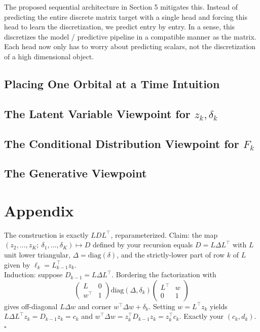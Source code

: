 \documentclass[12pt]{article}
\begin{document}
    The proposed sequential architecture in Section 5 mitigates this. Instead of predicting the entire discrete matrix target with a single head and forcing this head to learn the discretization, we predict entry by entry. In a sense, this discretizes the model / predictive pipeline in a compatible manner as the matrix. Each head now only has to worry about predicting scalars, not the discretization of a high dimensional object. 

    \subsection{Placing One Orbital at a Time Intuition}
    
    \subsection{The Latent Variable Viewpoint for $z_k, \delta_k$}

    \subsection{The Conditional Distribution Viewpoint for $F_k$}

    \subsection{The Generative Viewpoint}

    \section{Appendix}

    The construction is exactly $LDL^\top$, reparameterized. Claim: the map $(z_2,\dots,z_K;\ \delta_1,\dots,\delta_K) \mapsto D$ defined by your recursion equals $D = L\Delta L^\top$ with $L$ unit lower triangular, $\Delta = \mathrm{diag}(\delta)$, and the strictly-lower part of row $k$ of $L$ given by $\ell_k = L_{k-1}^\top z_k$. \\[-6pt]

    Induction: suppose $D_{k-1} = L\Delta L^\top$. Bordering the factorization with \[\begin{pmatrix} L & 0 \\ w^\top & 1\end{pmatrix}\mathrm{diag}(\Delta,\delta_k)\begin{pmatrix}L^\top & w \\ 0 & 1\end{pmatrix}\] gives off-diagonal $L\Delta w$ and corner $w^\top \Delta w + \delta_k$. Setting $w = L^\top z_k$ yields $L\Delta L^\top z_k = D_{k-1}z_k = c_k$ and $w^\top\Delta w = z_k^\top D_{k-1} z_k = z_k^\top c_k$. Exactly your $(c_k,d_k)$. $\square$ \\[-6pt]
\end{document}
